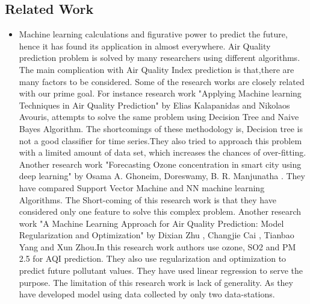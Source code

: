 \documentclass{article}
\begin{document}
\subsection{\color{brown} Related Work} 
  \begin{itemize}  
    \item Machine learning calculations and figurative power to predict the future, hence it has found its application in almost everywhere. Air Quality prediction problem is solved by many researchers using different algorithms. The main complication with Air Quality Index prediction is that,there are many factors to be considered. Some of the research works are closely related with our prime goal. For instance research work "Applying Machine learning Techniques in Air Quality Prediction" by Elias Kalapanidas and Nikolaos Avouris\textsuperscript{\cite{ref18}}, attempts to solve the same problem using Decision Tree and Naive Bayes Algorithm. The shortcomings of these methodology is, Decision tree is not a good classifier for time series.They also tried to approach this problem with a limited amount of data set, which increases the chances of over-fitting. Another research work "Forecasting Ozone concentration in smart city using deep learning" by Osama A. Ghoneim, Doreswamy, B. R. Manjunatha\textsuperscript{\cite{ref19}} . They have compared Support Vector Machine and NN machine learning Algorithms. The Short-coming of this research work is that they have considered only one feature to solve this complex problem. Another research work "A Machine Learning Approach for Air Quality Prediction: Model Regularization and Optimization" by Dixian Zhu , Changjie Cai , Tianbao Yang and Xun Zhou\textsuperscript{\cite{ref20}}.In this research work authors use ozone, SO2 and PM 2.5 for  AQI prediction. They also use regularization and optimization to predict future pollutant values. They have used linear regression to serve the purpose. The limitation of this research work is lack of generality. As they have developed model using data collected by only two data-stations.

\end{itemize}
\end{document}
